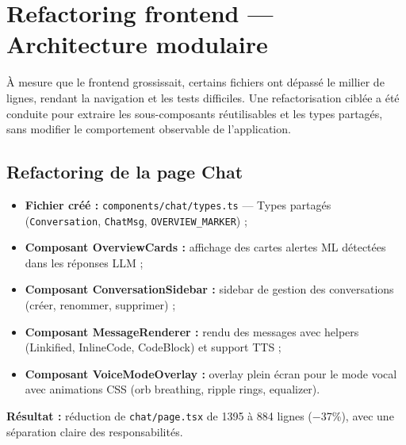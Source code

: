 \documentclass[12pt,a4paper]{report}
\begin{document}
\section{Refactoring frontend — Architecture modulaire}
\begin{onehalfspace}
À mesure que le frontend grossissait, certains fichiers ont dépassé le millier
de lignes, rendant la navigation et les tests difficiles. Une refactorisation
ciblée a été conduite pour extraire les sous-composants réutilisables et les
types partagés, sans modifier le comportement observable de l'application.

\subsection*{Refactoring de la page Chat}
\begin{itemize}
  \item[\ding{43}] \textbf{Fichier créé :} \texttt{components/chat/types.ts}
  — Types partagés (\texttt{Conversation}, \texttt{ChatMsg}, \texttt{OVERVIEW\_MARKER}) ;
  \item[\ding{43}] \textbf{Composant OverviewCards :} affichage des cartes
  alertes ML détectées dans les réponses LLM ;
  \item[\ding{43}] \textbf{Composant ConversationSidebar :} sidebar de gestion
  des conversations (créer, renommer, supprimer) ;
  \item[\ding{43}] \textbf{Composant MessageRenderer :} rendu des messages
  avec helpers (Linkified, InlineCode, CodeBlock) et support TTS ;
  \item[\ding{43}] \textbf{Composant VoiceModeOverlay :} overlay plein écran
  pour le mode vocal avec animations CSS (orb breathing, ripple rings, equalizer).
\end{itemize}

\textbf{Résultat :} réduction de \texttt{chat/page.tsx} de 1395 à 884 lignes
($-$37\%), avec une séparation claire des responsabilités.


\end{onehalfspace}
\end{document}
